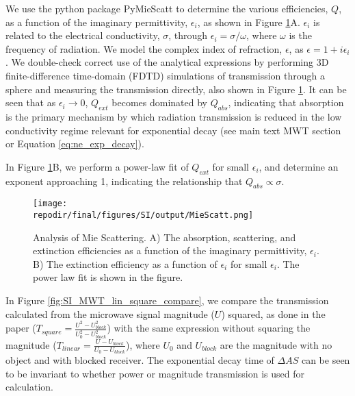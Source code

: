 We use the python package PyMieScatt to determine the various efficiencies, $Q$, as a function of the imaginary permittivity, $\epsilon_i$, as shown in Figure \ref{fig:SI_Mie_Scattering}A. $\epsilon_i$ is related to the electrical conductivity, $\sigma$, through $\epsilon_i = \sigma/\omega$, where $\omega$ is the frequency of radiation.\cite{coltonComplexWaveNumber2021}  We model the complex index of refraction, $\epsilon$, as $\epsilon = 1 + i\epsilon_i$. We double-check correct use of the analytical expressions by performing 3D finite-difference time-domain (FDTD) simulations of transmission through a sphere and measuring the transmission directly, also shown in Figure \ref{fig:SI_Mie_Scattering}. It can be seen that as $\epsilon_i \rightarrow 0$, $Q_{ext}$ becomes dominated by $Q_{abs}$, indicating that absorption is the primary mechanism by which radiation transmission is reduced in the low conductivity regime relevant for exponential decay (see main text MWT section or Equation \ref{eq:ne_exp_decay}).

In Figure \ref{fig:SI_Mie_Scattering}B, we perform a power-law fit of $Q_{ext}$ for small $\epsilon_i$, and determine an exponent approaching 1, indicating the relationship that $Q_{abs} \propto \sigma$. 


\begin{figure}[H]
\centering
\texttt{[image: \\repodir/final/figures/SI/output/MieScatt.png]}
\caption{Analysis of Mie Scattering. A) The absorption, scattering, and extinction efficiencies as a function of the imaginary permittivity, $\epsilon_i$. B) The extinction efficiency as a function of $\epsilon_i$ for small $\epsilon_i$. The power law fit is shown in the figure.}
\label{fig:SI_Mie_Scattering}
\end{figure}


In Figure \ref{fig:SI_MWT_lin_square_compare}, we compare the transmission calculated from the microwave signal magnitude ($U$) squared, as done in the paper ($T_{square}  = \frac{U^2 - U_{block}^2}{U_0^2 - U_{block}^2}$) with the same expression without squaring the magnitude ($T_{linear}  = \frac{U - U_{block}}{U_0 - U_{block}}$), where $U_0$ and $U_{block}$ are the magnitude with no object and with blocked receiver. The exponential decay time of $\Delta AS$ can be seen to be invariant to whether power or magnitude transmission is used for calculation. 


